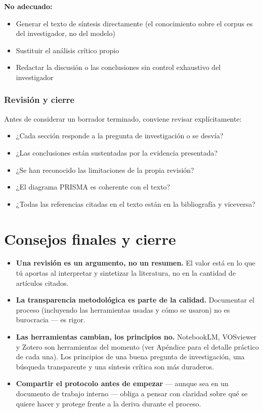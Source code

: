 \documentclass[
]{book}
\providecommand{\tightlist}{%
  \setlength{\itemsep}{0pt}\setlength{\parskip}{0pt}}
\begin{document}
\textbf{No adecuado:}

\begin{itemize}
\tightlist
\item
  Generar el texto de síntesis directamente (el conocimiento sobre el corpus es del investigador, no del modelo)
\item
  Sustituir el análisis crítico propio
\item
  Redactar la discusión o las conclusiones sin control exhaustivo del investigador
\end{itemize}

\subsection{Revisión y cierre}\label{revisiuxf3n-y-cierre}

Antes de considerar un borrador terminado, conviene revisar explícitamente:

\begin{itemize}
\tightlist
\item
  ¿Cada sección responde a la pregunta de investigación o se desvía?
\item
  ¿Las conclusiones están sustentadas por la evidencia presentada?
\item
  ¿Se han reconocido las limitaciones de la propia revisión?
\item
  ¿El diagrama PRISMA es coherente con el texto?
\item
  ¿Todas las referencias citadas en el texto están en la bibliografía y viceversa?
\end{itemize}

\chapter{Consejos finales y cierre}\label{consejos-finales-y-cierre}

\begin{itemize}
\tightlist
\item
  \textbf{Una revisión es un argumento, no un resumen.} El valor está en lo que tú aportas al interpretar y sintetizar la literatura, no en la cantidad de artículos citados.
\item
  \textbf{La transparencia metodológica es parte de la calidad.} Documentar el proceso (incluyendo las herramientas usadas y cómo se usaron) no es burocracia --- es rigor.
\item
  \textbf{Las herramientas cambian, los principios no.} NotebookLM, VOSviewer y Zotero son herramientas del momento (ver Apéndice para el detalle práctico de cada una). Los principios de una buena pregunta de investigación, una búsqueda transparente y una síntesis crítica son más duraderos.
\item
  \textbf{Compartir el protocolo antes de empezar} --- aunque sea en un documento de trabajo interno --- obliga a pensar con claridad sobre qué se quiere hacer y protege frente a la deriva durante el proceso.
\end{itemize}
\end{document}
